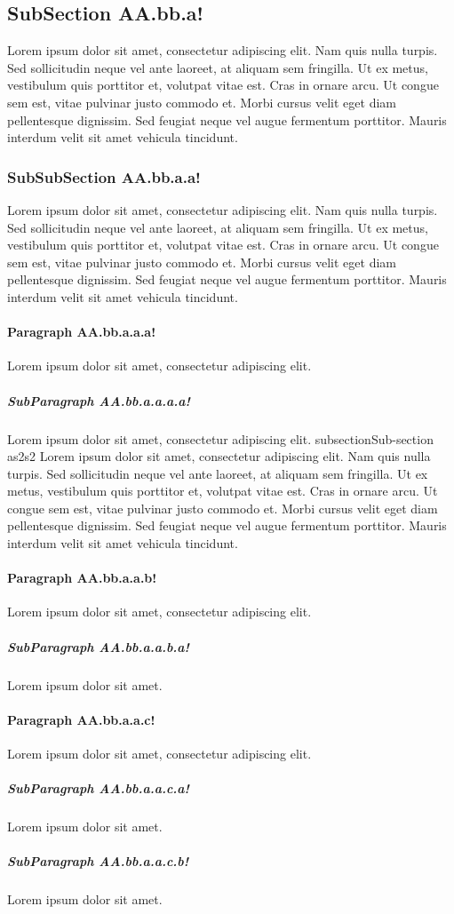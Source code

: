 \documentclass[a4paper,10pt]{report}
\begin{document}
\subsection{SubSection AA.bb.a!}
Lorem ipsum dolor sit amet, consectetur adipiscing elit. Nam quis nulla turpis. Sed sollicitudin
neque vel ante laoreet, at aliquam sem fringilla. Ut ex metus, vestibulum quis porttitor et, volutpat
vitae est. Cras in ornare arcu. Ut congue sem est, vitae pulvinar justo commodo et. Morbi cursus
velit eget diam pellentesque dignissim. Sed feugiat neque vel augue fermentum porttitor. Mauris
interdum velit sit amet vehicula tincidunt.
\subsubsection{SubSubSection AA.bb.a.a!}
Lorem ipsum dolor sit amet, consectetur adipiscing elit. Nam quis nulla turpis. Sed sollicitudin
neque vel ante laoreet, at aliquam sem fringilla. Ut ex metus, vestibulum quis porttitor et, volutpat
vitae est. Cras in ornare arcu. Ut congue sem est, vitae pulvinar justo commodo et. Morbi cursus
velit eget diam pellentesque dignissim. Sed feugiat neque vel augue fermentum porttitor. Mauris
interdum velit sit amet vehicula tincidunt.
\paragraph{Paragraph AA.bb.a.a.a!}
Lorem ipsum dolor sit amet, consectetur adipiscing elit.
\subparagraph{SubParagraph AA.bb.a.a.a.a!}
Lorem ipsum dolor sit amet, consectetur adipiscing elit.
subsection{Sub-section as2s2}
Lorem ipsum dolor sit amet, consectetur adipiscing elit. Nam quis nulla turpis. Sed sollicitudin
neque vel ante laoreet, at aliquam sem fringilla. Ut ex metus, vestibulum quis porttitor et, volutpat
vitae est. Cras in ornare arcu. Ut congue sem est, vitae pulvinar justo commodo et. Morbi cursus
velit eget diam pellentesque dignissim. Sed feugiat neque vel augue fermentum porttitor. Mauris
interdum velit sit amet vehicula tincidunt.
\paragraph{Paragraph AA.bb.a.a.b!}
Lorem ipsum dolor sit amet, consectetur adipiscing elit.
\subparagraph{SubParagraph AA.bb.a.a.b.a!}
Lorem ipsum dolor sit amet.
\paragraph{Paragraph AA.bb.a.a.c!}
Lorem ipsum dolor sit amet, consectetur adipiscing elit.
\subparagraph{SubParagraph AA.bb.a.a.c.a!}
Lorem ipsum dolor sit amet.
\subparagraph{SubParagraph AA.bb.a.a.c.b!}
Lorem ipsum dolor sit amet.
\end{document}
